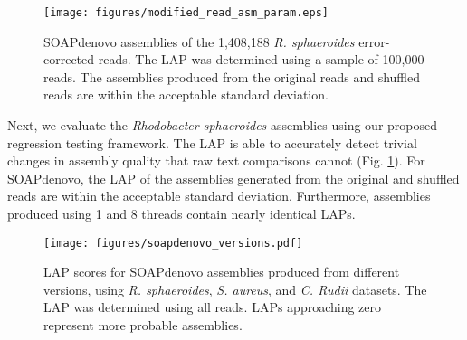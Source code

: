 

\begin{figure}[!htb]%
\begin{center}
  \texttt{[image: figures/modified\_read\_asm\_param.eps]}
\end{center}
\renewcommand{\baselinestretch}{1}
\small\normalsize
\begin{quote}
\caption[LAP scores for original and shuffled \emph{R. sphaeroides} dataset.]{SOAPdenovo assemblies of the 1,408,188 \emph{R. sphaeroides} error-corrected reads.  The LAP was determined using a sample of 100,000 reads.  The assemblies produced from the original reads and shuffled reads are within the acceptable standard deviation.}
\label{fig:modified_read_asm_param}
\end{quote}
\end{figure}
\renewcommand{\baselinestretch}{2}
\small\normalsize

Next, we evaluate the \emph{Rhodobacter sphaeroides} assemblies using our proposed regression testing framework.
The LAP is able to accurately detect trivial changes in assembly quality that raw text comparisons cannot (Fig. \ref{fig:modified_read_asm_param}).
For SOAPdenovo, the LAP of the assemblies generated from the original and shuffled reads are within the acceptable standard deviation.  Furthermore, assemblies produced using 1 and 8 threads contain nearly identical LAPs.

\begin{figure}[!htb]%
\begin{center}
  \texttt{[image: figures/soapdenovo\_versions.pdf]}
\end{center}
\renewcommand{\baselinestretch}{1}
\small\normalsize
\begin{quote}
  \caption[LAP scores for SOAPdenovo assemblies across various versions]{LAP scores for SOAPdenovo assemblies produced from different versions, using \emph{R. sphaeroides}, \emph{S. aureus}, and \emph{C. Rudii} datasets.
  The LAP was determined using all reads.  LAPs approaching zero represent more probable assemblies.
  }
  \label{fig:soapdenovo_versions}
\end{quote}
\end{figure}
\renewcommand{\baselinestretch}{2}
\small\normalsize


